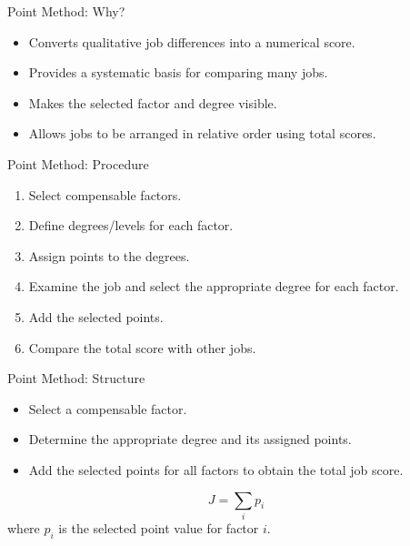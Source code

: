 \documentclass[aspectratio=169,10pt]{beamer}
\begin{document}
\begin{frame}{Point Method: Why?}
\begin{itemize}
  \item Converts qualitative job differences into a numerical score.
  \item Provides a systematic basis for comparing many jobs.
  \item Makes the selected factor and degree visible.
  \item Allows jobs to be arranged in relative order using total scores.
\end{itemize}
\end{frame}

\begin{frame}{Point Method: Procedure}
\begin{enumerate}
  \item Select compensable factors.
  \item Define degrees/levels for each factor.
  \item Assign points to the degrees.
  \item Examine the job and select the appropriate degree for each factor.
  \item Add the selected points.
  \item Compare the total score with other jobs.
\end{enumerate}
\end{frame}

\begin{frame}{Point Method: Structure}
\centering
{}
\vspace{0.35cm}
\begin{itemize}
  \item Select a compensable factor.
  \item Determine the appropriate degree and its assigned points.
  \item Add the selected points for all factors to obtain the total job score.
\end{itemize}
\[J=\sum_i p_i\]
where $p_i$ is the selected point value for factor $i$.
\end{frame}
\end{document}
